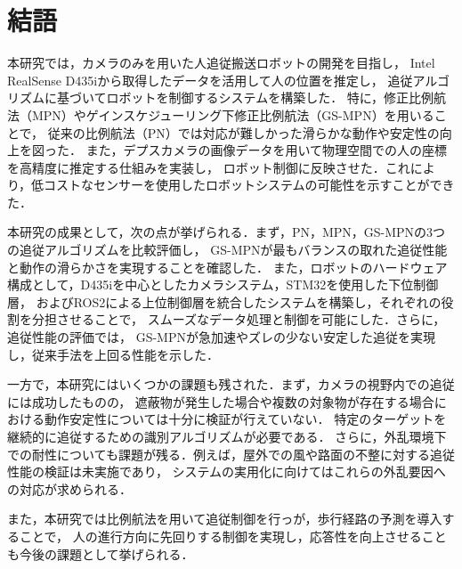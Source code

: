 \section{結語}
本研究では，カメラのみを用いた人追従搬送ロボットの開発を目指し，
Intel RealSense D435iから取得したデータを活用して人の位置を推定し，
追従アルゴリズムに基づいてロボットを制御するシステムを構築した．
特に，修正比例航法（MPN）やゲインスケジューリング下修正比例航法（GS-MPN）を用いることで，
従来の比例航法（PN）では対応が難しかった滑らかな動作や安定性の向上を図った．
また，デプスカメラの画像データを用いて物理空間での人の座標を高精度に推定する仕組みを実装し，
ロボット制御に反映させた．これにより，低コストなセンサーを使用したロボットシステムの可能性を示すことができた．

本研究の成果として，次の点が挙げられる．まず，PN，MPN，GS-MPNの3つの追従アルゴリズムを比較評価し，
GS-MPNが最もバランスの取れた追従性能と動作の滑らかさを実現することを確認した．
また，ロボットのハードウェア構成として，D435iを中心としたカメラシステム，STM32を使用した下位制御層，
およびROS2による上位制御層を統合したシステムを構築し，それぞれの役割を分担させることで，
スムーズなデータ処理と制御を可能にした．さらに，追従性能の評価では，
GS-MPNが急加速やズレの少ない安定した追従を実現し，従来手法を上回る性能を示した．

一方で，本研究にはいくつかの課題も残された．まず，カメラの視野内での追従には成功したものの，
遮蔽物が発生した場合や複数の対象物が存在する場合における動作安定性については十分に検証が行えていない．
特定のターゲットを継続的に追従するための識別アルゴリズムが必要である．
さらに，外乱環境下での耐性についても課題が残る．例えば，屋外での風や路面の不整に対する追従性能の検証は未実施であり，
システムの実用化に向けてはこれらの外乱要因への対応が求められる．

また，本研究では比例航法を用いて追従制御を行っが，歩行経路の予測を導入することで，
人の進行方向に先回りする制御を実現し，応答性を向上させることも今後の課題として挙げられる．

